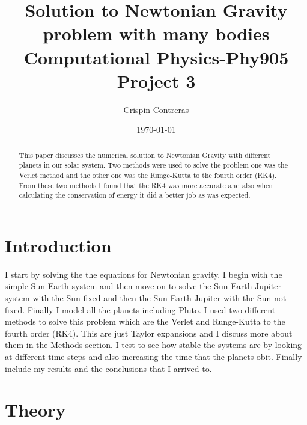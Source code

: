 \documentclass[11pt,a4wide]{article}
\begin{document}
\title{Solution to Newtonian Gravity problem with many bodies \break Computational Physics-Phy905 \break Project 3}
\author{Crispin Contreras}
\date{\today}
\maketitle


\begin{abstract}
This paper discusses the numerical solution to Newtonian Gravity with different planets in our solar system. Two methods were used to solve the problem one was the Verlet method and the other one was the Runge-Kutta to the fourth order (RK4). From these two methods I found that the RK4 was more accurate and also when calculating the conservation of energy it did a better job as was expected. 
\end{abstract}



\section{Introduction}
I start by solving the the equations for Newtonian gravity. I begin with the simple Sun-Earth system and then move on to solve the Sun-Earth-Jupiter system with the Sun fixed and then the Sun-Earth-Jupiter with the Sun not fixed. Finally I model all the planets including Pluto. I used two different methods to solve this problem which are the Verlet and Runge-Kutta to the fourth order (RK4). This are just Taylor expansions and I discuss more about them in the Methods section. I test to see how stable the systems are by looking at different time steps and also increasing the time that the planets obit. Finally include my results and the conclusions that I arrived to. 

\section{Theory}
\end{document}
